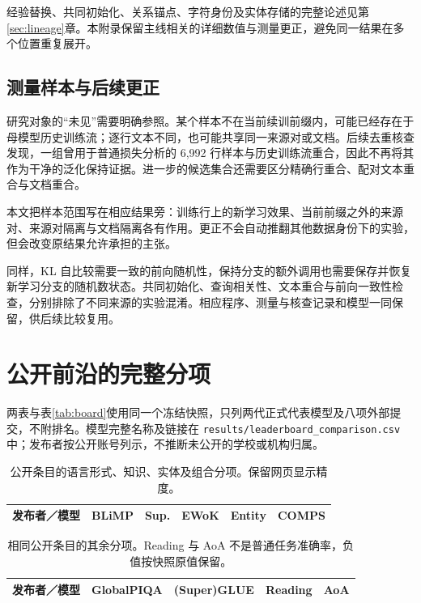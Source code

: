 经验替换、共同初始化、关系锚点、字符身份及实体存储的完整论述见第\ref{sec:lineage}章。本附录保留主线相关的详细数值与测量更正，避免同一结果在多个位置重复展开。

\subsection{测量样本与后续更正}

研究对象的“未见”需要明确参照。某个样本不在当前续训前缀内，可能已经存在于母模型历史训练流；逐行文本不同，也可能共享同一来源对或文档。后续去重核查发现，一组曾用于普通损失分析的 6,992 行样本与历史训练流重合，因此不再将其作为干净的泛化保持证据。进一步的候选集合还需要区分精确行重合、配对文本重合与文档重合。

本文把样本范围写在相应结果旁：训练行上的新学习效果、当前前缀之外的来源对、来源对隔离与文档隔离各有作用。更正不会自动推翻其他数据身份下的实验，但会改变原结果允许承担的主张。

同样，KL 自比较需要一致的前向随机性，保持分支的额外调用也需要保存并恢复新学习分支的随机数状态。共同初始化、查询相关性、文本重合与前向一致性检查，分别排除了不同来源的实验混淆。相应程序、测量与核查记录和模型一同保留，供后续比较复用。

\FloatBarrier\clearpage
\section{公开前沿的完整分项}
\label{app:board}

两表与表\ref{tab:board}使用同一个冻结快照，只列两代正式代表模型及八项外部提交，不附排名。模型完整名称及链接在 \nolinkurl{results/leaderboard_comparison.csv} 中；发布者按公开账号列示，不推断未公开的学校或机构归属。

\begin{table}[htbp]
\caption{公开条目的语言形式、知识、实体及组合分项。保留网页显示精度。}
\scriptsize\setlength{\tabcolsep}{3pt}
\begin{tabularx}{\linewidth}{@{}Yrrrrr@{}}
\toprule 发布者／模型 & BLiMP & Sup. & EWoK & Entity & COMPS\\\midrule

\end{tabularx}
\end{table}

\begin{table}[htbp]
\caption{相同公开条目的其余分项。Reading 与 AoA 不是普通任务准确率，负值按快照原值保留。}
\scriptsize\setlength{\tabcolsep}{3pt}
\begin{tabularx}{\linewidth}{@{}Yrrrr@{}}
\toprule 发布者／模型 & GlobalPIQA & (Super)GLUE & Reading & AoA\\\midrule

\end{tabularx}
\end{table}

